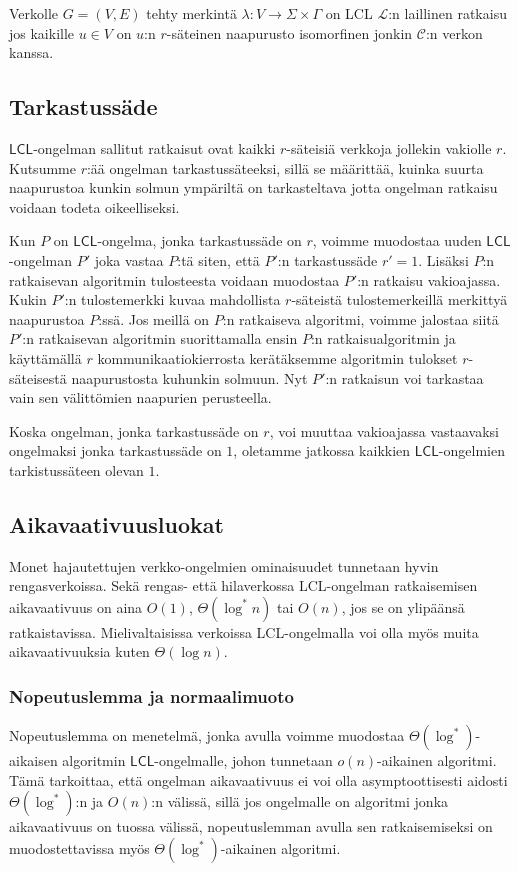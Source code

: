 \documentclass[12pt,finnish]{tktltiki2}
\theoremstyle{definition}
\theoremstyle{remark}
\newcommand*{\lcl}{\ensuremath{\mathsf{LCL}}}
\begin{document}
Verkolle $G = (V, E)$ tehty merkintä $\lambda : V \rightarrow \Sigma \times \Gamma$ on LCL $\mathcal{L}$:n laillinen ratkaisu jos kaikille $u \in V$ on $u$:n $r$-säteinen naapurusto isomorfinen jonkin $\mathcal{C}$:n verkon kanssa.

\subsection{Tarkastussäde}
\lcl -ongelman sallitut ratkaisut ovat kaikki $r$-säteisiä verkkoja jollekin vakiolle $r$. Kutsumme $r$:ää ongelman tarkastussäteeksi, sillä se määrittää, kuinka suurta naapurustoa kunkin solmun ympäriltä on tarkasteltava jotta ongelman ratkaisu voidaan todeta oikeelliseksi.

Kun $P$ on \lcl -ongelma, jonka tarkastussäde on $r$, voimme muodostaa uuden \lcl -ongelman $P'$ joka vastaa $P$:tä siten, että $P'$:n tarkastussäde $r' = 1$. Lisäksi $P$:n ratkaisevan algoritmin tulosteesta voidaan muodostaa $P'$:n ratkaisu vakioajassa. Kukin $P'$:n tulostemerkki kuvaa mahdollista $r$-säteistä tulostemerkeillä merkittyä naapurustoa $P$:ssä. Jos meillä on $P$:n ratkaiseva algoritmi, voimme jalostaa siitä $P'$:n ratkaisevan algoritmin suorittamalla ensin $P$:n ratkaisualgoritmin ja käyttämällä $r$ kommunikaatiokierrosta kerätäksemme algoritmin tulokset $r$-säteisestä naapurustosta kuhunkin solmuun. Nyt $P'$:n ratkaisun voi tarkastaa vain sen välittömien naapurien perusteella.

Koska ongelman, jonka tarkastussäde on $r$, voi muuttaa vakioajassa vastaavaksi ongelmaksi jonka tarkastussäde on $1$, oletamme jatkossa kaikkien \lcl -ongelmien tarkistussäteen olevan $1$.

\subsection{Aikavaativuusluokat}
Monet hajautettujen verkko-ongelmien ominaisuudet tunnetaan hyvin rengasverkoissa. Sekä rengas- että hilaverkossa LCL-ongelman ratkaisemisen aikavaativuus on aina $O(1)$, $\Theta (\log^* n)$ tai $O(n)$, jos se on ylipäänsä ratkaistavissa. Mielivaltaisissa verkoissa LCL-ongelmalla voi olla myös muita aikavaativuuksia kuten $\Theta(\log n)$.

\subsubsection{Nopeutuslemma ja normaalimuoto}
Nopeutuslemma on menetelmä, jonka avulla voimme muodostaa $\Theta(\log^*)$-aikaisen algoritmin \lcl -ongelmalle, johon tunnetaan $o(n)$-aikainen algoritmi. Tämä tarkoittaa, että ongelman aikavaativuus ei voi olla asymptoottisesti aidosti $\Theta(\log^*)$:n ja $O(n)$:n välissä, sillä jos ongelmalle on algoritmi jonka aikavaativuus on tuossa välissä, nopeutuslemman avulla sen ratkaisemiseksi on muodostettavissa myös $\Theta(\log^*)$-aikainen algoritmi.
\end{document}
